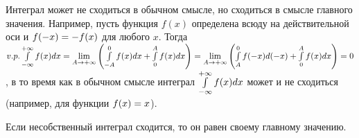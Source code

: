 \documentclass[a4paper,10pt]{article}
\begin{document}
	\begin{note}
		Интеграл может не сходиться в обычном смысле, но сходиться в смысле главного значения.
		 Например, пусть функция $f(x)$ определена всюду на действительной оси и $f(-x) \hm{=} -f(x)$
		 для любого $x$. Тогда $v.p. \intl^{+ \infty}_{- \infty} f(x) dx \hm{=} \liml_{A \to + \infty}
		 \left( \intl^0_{-A} f(x)dx + \intl^A_0 f(x)dx \right) \hm{=} \liml_{A \to + \infty} \left(
		 \intl^0_A f(-x)d(-x) + \intl^A_0 f(x)dx \right) \hm{=} 0$, в то время как в обычном смысле
		 интеграл $\mathop{\int}\limits^{+ \infty}_{- \infty} f(x)dx$ может и не сходиться (например, для функции 
		 $f(x) \hm{=} x$).
	\end{note}

	\begin{note}
		Если несобственный интеграл сходится, то он равен своему главному значению.
	\end{note}
\end{document}
